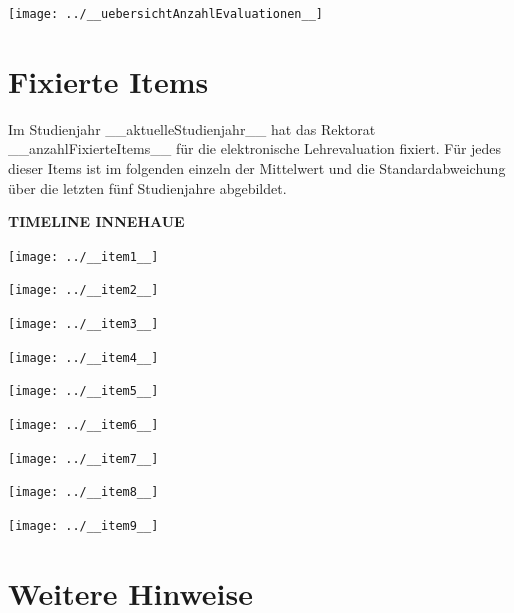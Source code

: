 \documentclass[11pt]{article}
\begin{document}
\texttt{[image: ../\_\_uebersichtAnzahlEvaluationen\_\_]}

\newpage
\section{Fixierte Items}
\label{sec: fixierteItems}
Im Studienjahr __aktuelleStudienjahr__ hat das Rektorat __anzahlFixierteItems__ für die elektronische Lehrevaluation fixiert. Für jedes dieser Items ist im folgenden einzeln der Mittelwert und die Standardabweichung über die letzten fünf Studienjahre abgebildet.

\textbf{TIMELINE INNEHAUE}
\bigskip

\texttt{[image: ../\_\_item1\_\_]}

\texttt{[image: ../\_\_item2\_\_]}

\texttt{[image: ../\_\_item3\_\_]}

\texttt{[image: ../\_\_item4\_\_]}

\texttt{[image: ../\_\_item5\_\_]}

\texttt{[image: ../\_\_item6\_\_]}

\texttt{[image: ../\_\_item7\_\_]}

\texttt{[image: ../\_\_item8\_\_]}

\texttt{[image: ../\_\_item9\_\_]}




\newpage
\section{Weitere Hinweise}
\label{weiteres}
\end{document}
